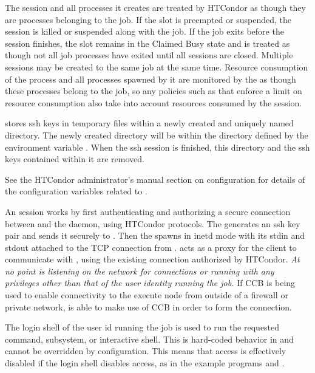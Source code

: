 \begin{ManPage}
The  session and all processes it creates are treated by HTCondor as
though they are processes belonging to the job.
If the slot is preempted or suspended,
the  session is killed or suspended along with the job.
If the job exits before the  session finishes,
the slot remains in the Claimed Busy state and is treated as though not
all job processes have exited until all  sessions are closed.
Multiple  sessions may be created to the same job at the
same time.  Resource consumption of the  process and all processes
spawned by it are monitored by the  as though these
processes belong to the job, so any policies such as  that
enforce a limit on resource consumption also take into account resources
consumed by the  session.

 stores ssh keys in temporary files within a newly
created and uniquely named directory.
The newly created directory will be within the directory defined
by the environment variable . 
When the ssh session is finished, this directory and the ssh keys
contained within it are removed.

See the HTCondor administrator's manual section on configuration 
for details of the configuration variables related to .

An  session works by first authenticating and authorizing
a secure connection between  and the 
daemon, using HTCondor protocols.
The  generates an ssh key
pair and sends it securely to .
Then the  spawns  in inetd mode with its
stdin and stdout attached to the TCP connection from .
 acts as a proxy
for the  client to communicate with ,
using the existing connection authorized by HTCondor.
\emph{At no point is 
listening on the network for connections or running with any privileges
other than that of the user identity running the job.}
If CCB is being used to enable connectivity to the execute node from
outside of a firewall or private network,  is
able to make use of CCB in order to form the  connection.

The login shell of the user id running the job is used to run the
requested command,  subsystem, or interactive shell.  This
is hard-coded behavior in  and cannot be overridden by
configuration.  This means that  access is
effectively disabled if the login shell disables access,
as in the example programs
 and .


\end{ManPage}
